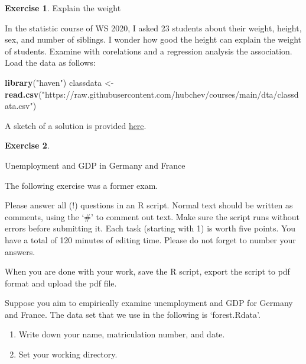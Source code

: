 \documentclass[
  12pt,
  oneside]{book}
\newenvironment{Shaded}{\begin{snugshade}}{\end{snugshade}}
\newcommand{\FunctionTok}[1]{\textcolor[rgb]{0.13,0.29,0.53}{\textbf{#1}}}
\newcommand{\NormalTok}[1]{#1}
\newcommand{\OtherTok}[1]{\textcolor[rgb]{0.56,0.35,0.01}{#1}}
\newcommand{\StringTok}[1]{\textcolor[rgb]{0.31,0.60,0.02}{#1}}
\theoremstyle{definition}
\theoremstyle{definition}
\theoremstyle{definition}
\newtheorem{exercise}{Exercise}[chapter]
\theoremstyle{definition}
\theoremstyle{remark}
\begin{document}
\begin{exercise}
\protect\hypertarget{exr:explainweight}{}\label{exr:explainweight}Explain the weight

In the statistic course of WS 2020, I asked 23 students about their weight, height, sex, and number of siblings. I wonder how good the height can explain the weight of students. Examine with corelations and a regression analysis the association. Load the data as follows:
\end{exercise}

\begin{Shaded}
\begin{Highlighting}[]
\FunctionTok{library}\NormalTok{(}\StringTok{"haven"}\NormalTok{)}
\NormalTok{classdata }\OtherTok{\textless{}{-}} \FunctionTok{read.csv}\NormalTok{(}\StringTok{"https://raw.githubusercontent.com/hubchev/courses/main/dta/classdata.csv"}\NormalTok{)}
\end{Highlighting}
\end{Shaded}

A sketch of a solution is provided \href{https://raw.githubusercontent.com/hubchev/courses/main/scr/regress_lecture.R}{here}.

\begin{exercise}
\protect\hypertarget{exr:unemgerfra}{}\label{exr:unemgerfra}

Unemployment and GDP in Germany and France

The following exercise was a former exam.

Please answer all (!) questions in an R script. Normal text should be written as comments, using the `\#' to comment out text. Make sure the script runs without errors before submitting it. Each task (starting with 1) is worth five points. You have a total of 120 minutes of editing time. Please do not forget to number your answers.

When you are done with your work, save the R script, export the script to pdf format and upload the pdf file.

Suppose you aim to empirically examine unemployment and GDP for Germany and France. The data set that we use in the following is `forest.Rdata'.

\begin{enumerate}
\def\labelenumi{(\arabic{enumi})}
\setcounter{enumi}{-1}
\item
  Write down your name, matriculation number, and date.
\item
  Set your working directory.
\end{enumerate}

\end{exercise}
\end{document}
